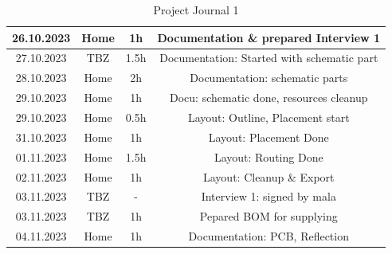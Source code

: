 \begin{table}[H]
\begin{tabular}{||c | c | c || c||}
 \hline
   26.10.2023 & Home & 1h & Documentation \& prepared Interview 1 \\ 
 \hline
  27.10.2023 & TBZ & 1.5h & Documentation: Started with schematic part \\ 
 \hline
  28.10.2023 & Home & 2h & Documentation: schematic parts \\ 
 \hline
  29.10.2023 & Home & 1h & Docu: schematic done, resources cleanup \\ 
 \hline
   29.10.2023 & Home & 0.5h & Layout: Outline, Placement start \\ 
 \hline
   31.10.2023 & Home & 1h & Layout: Placement Done \\ 
 \hline   
   01.11.2023 & Home & 1.5h & Layout: Routing Done \\ 
 \hline
  02.11.2023 & Home & 1h & Layout: Cleanup \& Export \\ 
 \hline
  03.11.2023 & TBZ & - & Interview 1: signed by mala \\ 
 \hline  
  03.11.2023 & TBZ & 1h & Pepared BOM for supplying \\ 
 \hline
  04.11.2023 & Home & 1h & Documentation: PCB, Reflection \\ 
 \hline

\end{tabular}
    \caption{Project Journal 1}\label{tab:Project Journal 1}
\end{table}

\newpage

